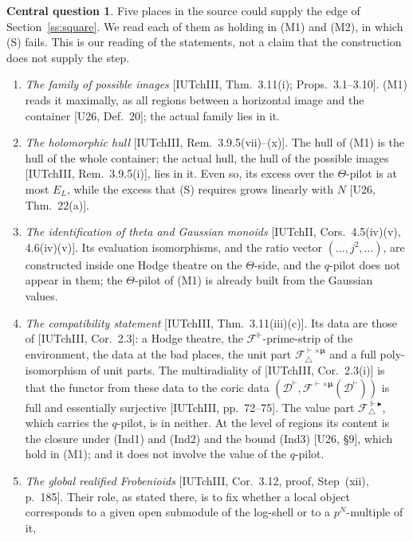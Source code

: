 \documentclass[11pt]{article}
\theoremstyle{definition}
\newtheorem*{centralq}{Central question}
\begin{document}
\begin{centralq}
Five places in the source could supply the edge of
Section~\ref{ss:square}.  We read each of them as holding in (M1)
and (M2), in which (S) fails.  This is our reading of the
statements, not a claim that the construction does not supply the
step.
\begin{enumerate}[label=(\alph*),leftmargin=*]
\item \emph{The family of possible images}
[IUTchIII, Thm.~3.11(i); Props.~3.1--3.10].  (M1) reads it
maximally, as all regions between a horizontal image and the
container [U26, Def.~20]; the actual family lies in it.
\item \emph{The holomorphic hull} [IUTchIII, Rem.~3.9.5(vii)--(x)].
The hull of (M1) is the hull of the whole container; the actual
hull, the hull of the possible images [IUTchIII, Rem.~3.9.5(i)], lies
in it.  Even so, its excess over the $\Theta$-pilot is at most
$E_L$, while the excess that (S) requires grows linearly with $N$
[U26, Thm.~22(a)].
\item \emph{The identification of theta and Gaussian monoids}
[IUTchII, Cors.~4.5(iv)(v), 4.6(iv)(v)].  Its evaluation
isomorphisms, and the ratio vector $(\dots,j^2,\dots)$, are
constructed inside one Hodge theatre on the $\Theta$-side, and the
$q$-pilot does not appear in them; the $\Theta$-pilot of (M1) is
already built from the Gaussian values.
\item \emph{The compatibility statement}
[IUTchIII, Thm.~3.11(iii)(c)].  Its data are those of
[IUTchIII, Cor.~2.3]: a Hodge theatre, the
$\mathcal F^{\Vdash}$-prime-strip of the environment, the data at
the bad places, the unit part
$\mathcal F^{\vdash\times\boldsymbol\mu}_{\triangle}$ and a full
poly-isomorphism of unit parts.  The multiradiality of
[IUTchIII, Cor.~2.3(i)] is that the functor from these data to the
coric data
$(\mathcal D^{\vdash},\mathcal F^{\vdash\times\boldsymbol\mu}(\mathcal D^{\vdash}))$
is full and essentially surjective [IUTchIII, pp.~72--75].  The value
part $\mathcal F^{\Vdash\blacktriangleright}_{\triangle}$, which
carries the $q$-pilot, is in neither.  At the level of regions its
content is the closure under (Ind1) and (Ind2) and the bound (Ind3)
[U26, \S9], which hold in (M1); and it does not involve the value of
the $q$-pilot.
\item \emph{The global realified Frobenioids}
[IUTchIII, Cor.~3.12, proof, Step~(xii), p.~185].  Their role, as
stated there, is to fix whether a local object corresponds to a
given open submodule of the log-shell or to a $p^N$-multiple of it,

\end{enumerate}
\end{centralq}
\end{document}
